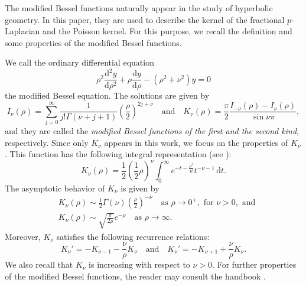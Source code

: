 \documentclass[11pt]{amsart}
\theoremstyle{plain}
\theoremstyle{definition}
\numberwithin{equation}{section}
\begin{document}
The modified Bessel functions naturally appear in the study of hyperbolic geometry. In this paper, they are used to describe the kernel of the fractional $p$-Laplacian and the Poisson kernel. For this purpose, we recall the definition and some properties of the modified Bessel functions.

We call the ordinary differential equation
\begin{equation*}
\rho^{2} \frac{\mathrm{d}^{2} y}{\mathrm{d} \rho^{2}} + \rho \frac{\mathrm{d} y}{\mathrm{d} \rho} - (\rho^{2} + \nu^{2})y =0
\end{equation*}
the modified Bessel equation. The solutions are given by
\begin{equation*}
I_{\nu}(\rho) = \sum_{j=0}^{\infty} \frac{1}{j! \Gamma(\nu+j+1)}\left( \frac{\rho}{2} \right)^{2j+\nu} \quad \text{and} \quad K_{\nu}(\rho) = \frac{\pi}{2} \frac{I_{-\nu}(\rho)-I_{\nu}(\rho)}{\sin \nu \pi},
\end{equation*}
and they are called the {\it modified Bessel functions of the first and the second kind}, respectively. Since only $K_{\nu}$ appears in this work, we focus on the properties of $K_{\nu}$. This function has the following integral representation (see \cite[10.32.10]{OLBC10}):
\begin{equation} \label{eq:K-integral}
K_{\nu}(\rho) = \frac{1}{2}\left( \frac{1}{2}\rho \right)^{\nu} \int_{0}^{\infty} e^{-t-\frac{\rho^2}{4t}} t^{-\nu-1} \,\mathrm{d}t.
\end{equation}
The asymptotic behavior of $K_{\nu}$ is given by
\begin{equation} \label{eq:K-asymptotic}
\begin{split}
&K_{\nu}(\rho) \sim \frac{1}{2} \Gamma(\nu) \left( \frac{\rho}{2} \right)^{-\nu} \quad\text{as } \rho \to 0^{+}, \text{ for } \nu > 0, \text{ and} \\
&K_{\nu}(\rho) \sim \sqrt{\frac{\pi}{2\rho}} e^{-\rho} \quad\text{as } \rho \to \infty.
\end{split}
\end{equation}
Moreover, $K_{\nu}$ satisfies the following recurrence relations:
\begin{equation} \label{eq:K-recurrence}
K_{\nu}' = -K_{\nu-1}-\frac{\nu}{\rho}K_{\nu} \quad\text{and}\quad K_{\nu}' = -K_{\nu+1}+\frac{\nu}{\rho} K_{\nu}.
\end{equation}
We also recall that $K_{\nu}$ is increasing with respect to $\nu > 0$. For further properties of the modified Bessel functions, the reader may consult the handbook \cite{OLBC10}.
\end{document}
